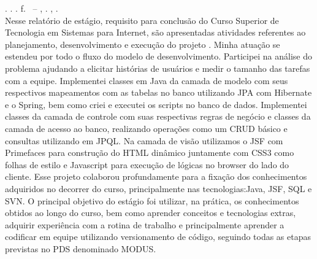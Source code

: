 
\begin{resumo}[RESUMO]
\begin{SingleSpacing}

\imprimirautorcitacao. \imprimirtitulo. \imprimirdata. \pageref {LastPage} f. \imprimirprojeto\ – \imprimirprograma, \imprimirinstituicao. \imprimirlocal, \imprimirdata.\\


Nesse relatório de estágio, requisito para conclusão do Curso Superior de Tecnologia em Sistemas para Internet, são apresentadas atividades referentes ao planejamento, desenvolvimento e execução do projeto \imprimirtitulo. Minha atuação se estendeu por todo o fluxo do modelo de desenvolvimento. Participei na análise do problema ajudando a elicitar histórias de usuários e medir o tamanho das tarefas com a equipe. Implementei classes em Java da camada de modelo com seus respectivos mapeamentos com as tabelas no banco utilizando JPA com Hibernate e o Spring, bem como criei e executei os scripts no banco de dados. Implementei classes da camada de controle com suas respectivas regras de negócio e classes da camada de acesso ao banco, realizando operações como um CRUD básico e consultas utilizando em JPQL. Na camada de visão utilizamos o JSF com Primefaces para construção do HTML dinâmico juntamente com CSS3 como folhas de estilo e Javascript para execução de lógicas no browser do lado do cliente. Esse projeto colaborou profundamente para a fixação dos conhecimentos adquiridos no decorrer do curso, principalmente nas tecnologias:Java, JSF, SQL e SVN. O principal objetivo do estágio foi utilizar, na prática, os conhecimentos obtidos ao longo do curso, bem como aprender conceitos e tecnologias extras, adquirir experiência com a rotina de trabalho e principalmente aprender a codificar em equipe utilizando versionamento de código, seguindo todas as etapas previstas no PDS denominado MODUS.\\ 




\end{SingleSpacing}
\end{resumo}
